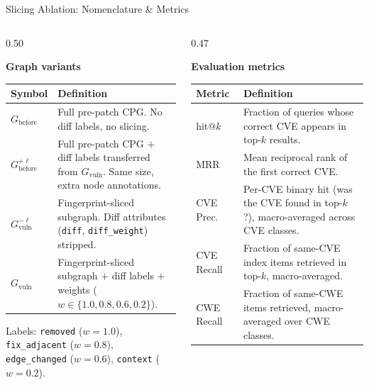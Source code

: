 \documentclass[aspectratio=169,10pt]{beamer}
\begin{document}
\begin{frame}{Slicing Ablation: Nomenclature \& Metrics}
\begin{columns}[T]
\begin{column}{0.50\textwidth}

  \textbf{Graph variants}

  \vspace{0.3em}
  {\small
  \renewcommand{\arraystretch}{1}
  \begin{tabular}{p{2.5cm}p{4.5cm}}
    \toprule
    \textbf{Symbol} & \textbf{Definition} \\
    \midrule
    $G_{\text{before}}$
      & Full pre-patch CPG.  No diff labels, no slicing. \\
    $G_{\text{before}}^{+\ell}$
      & Full pre-patch CPG $+$ diff labels transferred from $G_{\text{vuln}}$.
        Same size, extra node annotations. \\
    $G_{\text{vuln}}^{-\ell}$
      & Fingerprint-sliced subgraph.  Diff attributes (\texttt{diff}, \texttt{diff\_weight}) stripped. \\
    $G_{\text{vuln}}$
      & Fingerprint-sliced subgraph $+$ diff labels $+$ weights
        ($w \in \{1.0, 0.8, 0.6, 0.2\}$). \\
    \bottomrule
  \end{tabular}}

  \vspace{0.6em}
  {\scriptsize\color{black!55}
  Labels: \texttt{removed} ($w{=}1.0$), \texttt{fix\_adjacent} ($w{=}0.8$),
  \texttt{edge\_changed} ($w{=}0.6$), \texttt{context} ($w{=}0.2$).}

\end{column}
\begin{column}{0.47\textwidth}

  \textbf{Evaluation metrics}

  \vspace{0.3em}
  {\small
  \renewcommand{\arraystretch}{1}
  \begin{tabular}{p{2.0cm}p{4.5cm}}
    \toprule
    \textbf{Metric} & \textbf{Definition} \\
    \midrule
    hit@$k$
      & Fraction of queries whose correct CVE appears in top-$k$ results. \\
    MRR
      & Mean reciprocal rank of the first correct CVE. \\
    CVE Prec.
      & Per-CVE binary hit (was the CVE found in top-$k$?), macro-averaged across CVE classes. \\
    CVE Recall
      & Fraction of same-CVE index items retrieved in top-$k$, macro-averaged. \\
    CWE Recall
      & Fraction of same-CWE items retrieved, macro-averaged over CWE classes. \\
    \bottomrule
  \end{tabular}}


\end{column}
\end{columns}
\end{frame}
\end{document}
